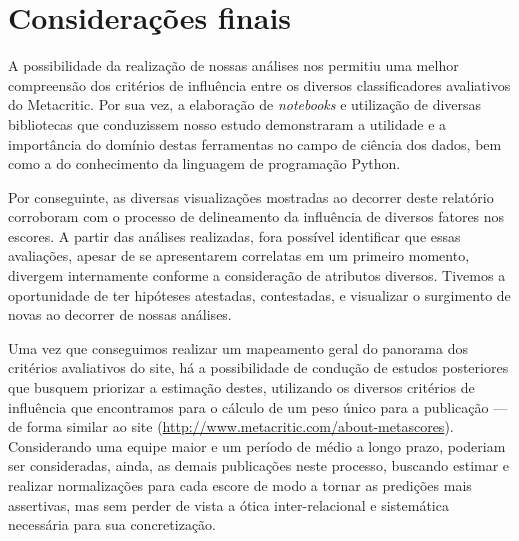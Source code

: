 \documentclass[review]{elsarticle}
\begin{document}
\section{Considerações finais}

A possibilidade da realização de nossas análises nos permitiu uma melhor compreensão dos critérios de influência entre os diversos classificadores avaliativos do Metacritic. Por sua vez, a elaboração de \textit{notebooks} e utilização de diversas bibliotecas que conduzissem nosso estudo demonstraram a utilidade e a importância do domínio destas ferramentas no campo de ciência dos dados, bem como a do conhecimento da linguagem de programação Python. 

Por conseguinte, as diversas visualizações mostradas ao decorrer deste relatório corroboram com o processo de delineamento da influência de diversos fatores nos escores. A partir das análises realizadas, fora possível identificar que essas avaliações, apesar de se apresentarem correlatas em um primeiro momento, divergem internamente conforme a consideração de atributos diversos. Tivemos a oportunidade de ter hipóteses atestadas, contestadas, e visualizar o surgimento de novas ao decorrer de nossas análises. 

Uma vez que conseguimos realizar um mapeamento geral do panorama dos critérios avaliativos do site, há a possibilidade de condução de estudos posteriores que busquem priorizar a estimação destes, utilizando os diversos critérios de influência que encontramos para o cálculo de um peso único para a publicação — de forma similar ao site (\url{http://www.metacritic.com/about-metascores}). Considerando uma equipe maior e um período de médio a longo prazo, poderiam ser consideradas, ainda, as demais publicações neste processo, buscando estimar e realizar normalizações para cada escore de modo a tornar as predições mais assertivas, mas sem perder de vista a ótica inter-relacional e sistemática necessária para sua concretização.
\end{document}
